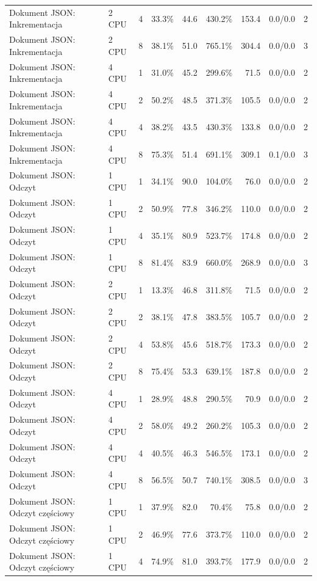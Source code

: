 \begin{table}[ht]
{\begin{tabular}{llcrrrrcc}
Dokument JSON: Inkrementacja & 2 CPU & 4 & 33.3\% & 44.6 & 430.2\% & 153.4 & 0.0/0.0 & 2 \\
Dokument JSON: Inkrementacja & 2 CPU & 8 & 38.1\% & 51.0 & 765.1\% & 304.4 & 0.0/0.0 & 3 \\
Dokument JSON: Inkrementacja & 4 CPU & 1 & 31.0\% & 45.2 & 299.6\% & 71.5 & 0.0/0.0 & 2 \\
Dokument JSON: Inkrementacja & 4 CPU & 2 & 50.2\% & 48.5 & 371.3\% & 105.5 & 0.0/0.0 & 2 \\
Dokument JSON: Inkrementacja & 4 CPU & 4 & 38.2\% & 43.5 & 430.3\% & 133.8 & 0.0/0.0 & 2 \\
Dokument JSON: Inkrementacja & 4 CPU & 8 & 75.3\% & 51.4 & 691.1\% & 309.1 & 0.1/0.0 & 3 \\
Dokument JSON: Odczyt & 1 CPU & 1 & 34.1\% & 90.0 & 104.0\% & 76.0 & 0.0/0.0 & 2 \\
Dokument JSON: Odczyt & 1 CPU & 2 & 50.9\% & 77.8 & 346.2\% & 110.0 & 0.0/0.0 & 2 \\
Dokument JSON: Odczyt & 1 CPU & 4 & 35.1\% & 80.9 & 523.7\% & 174.8 & 0.0/0.0 & 2 \\
Dokument JSON: Odczyt & 1 CPU & 8 & 81.4\% & 83.9 & 660.0\% & 268.9 & 0.0/0.0 & 3 \\
Dokument JSON: Odczyt & 2 CPU & 1 & 13.3\% & 46.8 & 311.8\% & 71.5 & 0.0/0.0 & 2 \\
Dokument JSON: Odczyt & 2 CPU & 2 & 38.1\% & 47.8 & 383.5\% & 105.7 & 0.0/0.0 & 2 \\
Dokument JSON: Odczyt & 2 CPU & 4 & 53.8\% & 45.6 & 518.7\% & 173.3 & 0.0/0.0 & 2 \\
Dokument JSON: Odczyt & 2 CPU & 8 & 75.4\% & 53.3 & 639.1\% & 187.8 & 0.0/0.0 & 2 \\
Dokument JSON: Odczyt & 4 CPU & 1 & 28.9\% & 48.8 & 290.5\% & 70.9 & 0.0/0.0 & 2 \\
Dokument JSON: Odczyt & 4 CPU & 2 & 58.0\% & 49.2 & 260.2\% & 105.3 & 0.0/0.0 & 2 \\
Dokument JSON: Odczyt & 4 CPU & 4 & 40.5\% & 46.3 & 546.5\% & 173.1 & 0.0/0.0 & 2 \\
Dokument JSON: Odczyt & 4 CPU & 8 & 56.5\% & 50.7 & 740.1\% & 308.5 & 0.0/0.0 & 3 \\
Dokument JSON: Odczyt częściowy & 1 CPU & 1 & 37.9\% & 82.0 & 70.4\% & 75.8 & 0.0/0.0 & 2 \\
Dokument JSON: Odczyt częściowy & 1 CPU & 2 & 46.9\% & 77.6 & 373.7\% & 110.0 & 0.0/0.0 & 2 \\
Dokument JSON: Odczyt częściowy & 1 CPU & 4 & 74.9\% & 81.0 & 393.7\% & 177.9 & 0.0/0.0 & 2 \\

\end{tabular}}
\end{table}

